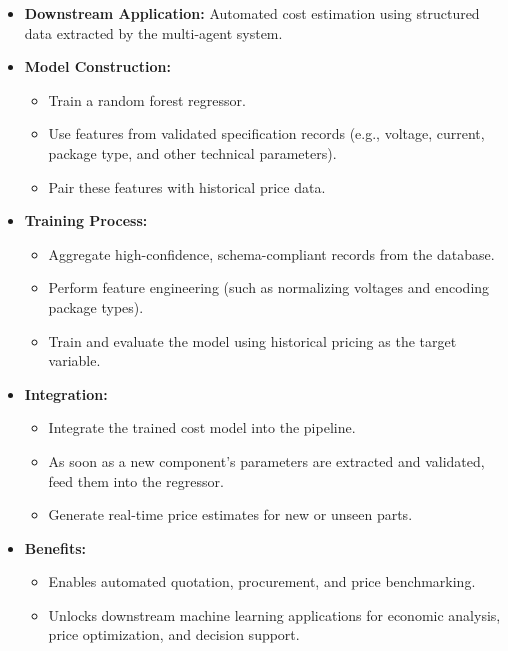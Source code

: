 \begin{itemize}
  \item \textbf{Downstream Application:}  
    Automated cost estimation using structured data extracted by the multi-agent system.
  
  \item \textbf{Model Construction:}
    \begin{itemize}
      \item Train a random forest regressor.
      \item Use features from validated specification records (e.g., voltage, current, package type, and other technical parameters).
      \item Pair these features with historical price data.
    \end{itemize}
  
  \item \textbf{Training Process:}
    \begin{itemize}
      \item Aggregate high-confidence, schema-compliant records from the database.
      \item Perform feature engineering (such as normalizing voltages and encoding package types).
      \item Train and evaluate the model using historical pricing as the target variable.
    \end{itemize}
  
  \item \textbf{Integration:}
    \begin{itemize}
      \item Integrate the trained cost model into the pipeline.
      \item As soon as a new component's parameters are extracted and validated, feed them into the regressor.
      \item Generate real-time price estimates for new or unseen parts.
    \end{itemize}
  
  \item \textbf{Benefits:}
    \begin{itemize}
      \item Enables automated quotation, procurement, and price benchmarking.
      \item Unlocks downstream machine learning applications for economic analysis, price optimization, and decision support.
    \end{itemize}
\end{itemize}

